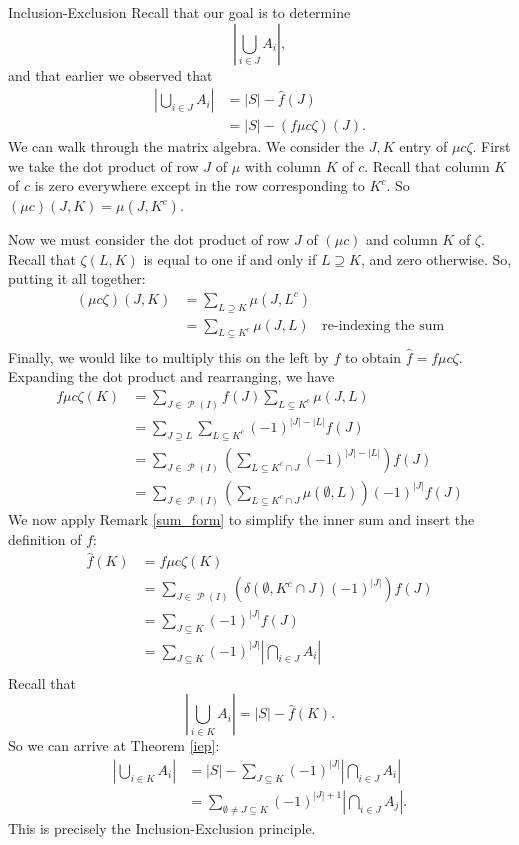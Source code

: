 \documentclass[12pt]{pom_thesis}
\DeclareMathOperator{\ps}{\mathscr{P}}
\begin{document}
\begin{chapter}{Inclusion-Exclusion}
Recall that our goal is to determine 
\[
\left| \bigcup_{i \in J} A_i \right|,
\]
and that earlier we observed that
\begin{align*}
\left| \bigcup_{i \in J} A_i \right| &= |S| - \hat{f}(J)\\
&= |S| - (f\mu c\zeta)(J).
\end{align*}
We can walk through the matrix algebra. We consider the $J,K$ entry of $\mu c \zeta$. First we take the dot product of row $J$ of $\mu$ with column $K$ of $c$. Recall that column $K$ of $c$ is zero everywhere except in the row corresponding to $K^c$. So $(\mu c)(J,K) = \mu(J, K^c)$. 

Now we must consider the dot product of row $J$ of $(\mu c)$ and column $K$ of $\zeta$. Recall that $\zeta(L,K)$ is equal to one if and only if $L \supseteq K$, and zero otherwise. So, putting it all together:
\begin{align*}
(\mu c \zeta)(J,K) &= \sum_{L \supseteq K} \mu(J, L^c)\\
&= \sum_{L \subseteq K^c} \mu(J, L) &\text{re-indexing the sum}\\
\end{align*}
Finally, we would like to multiply this on the left by $f$ to obtain $\hat{f} = f\mu c\zeta$. Expanding the dot product and rearranging, we have
\begin{align*}
f\mu c\zeta(K) &= \sum_{J \in \ps(I)} f(J) \sum_{L \subseteq K^c} \mu(J,L)\\
&= \sum_{J \supseteq L} \sum_{L \subseteq K^c} (-1)^{|J|-|L|} f(J)\\
&= \sum_{J \in \ps(I)}\left( \sum_{L \subseteq K^c \cap J}(-1)^{|J| - |L|} \right) f(J)\\
&= \sum_{J \in \ps(I)}\left( \sum_{L \subseteq K^c \cap J}\mu(\emptyset, L)\right) (-1)^{|J|}f(J)
\end{align*}
We now apply Remark \ref{sum_form} to simplify the inner sum and insert the definition of $f$:
\begin{align*}
\hat{f}(K) &= f\mu c\zeta(K) \\
&=  \sum_{J \in \ps(I)}(\delta(\emptyset, K^c \cap J)(-1)^{|J|} )f(J)\\
&= \sum_{J \subseteq K}(-1)^{|J|}f(J)\\
&= \sum_{J \subseteq K}(-1)^{|J|}\left| \bigcap_{i \in J} A_i\right|\\
\end{align*}
Recall that 
\[
\left| \bigcup_{i \in K} A_i \right| = |S| - \hat{f}(K).
\]
So we can arrive at Theorem \ref{iep}:
\begin{align*}
\left| \bigcup_{i \in K} A_i \right| &= |S| - \sum_{J \subseteq K}(-1)^{|J|}\left| \bigcap_{i \in J} A_i\right|\\
&= \sum_{\emptyset \neq J \subseteq K}(-1)^{|J| + 1}\left|\bigcap_{i \in J}A_j\right|.
\end{align*}
This is precisely the Inclusion-Exclusion principle.


\end{chapter}
\end{document}

